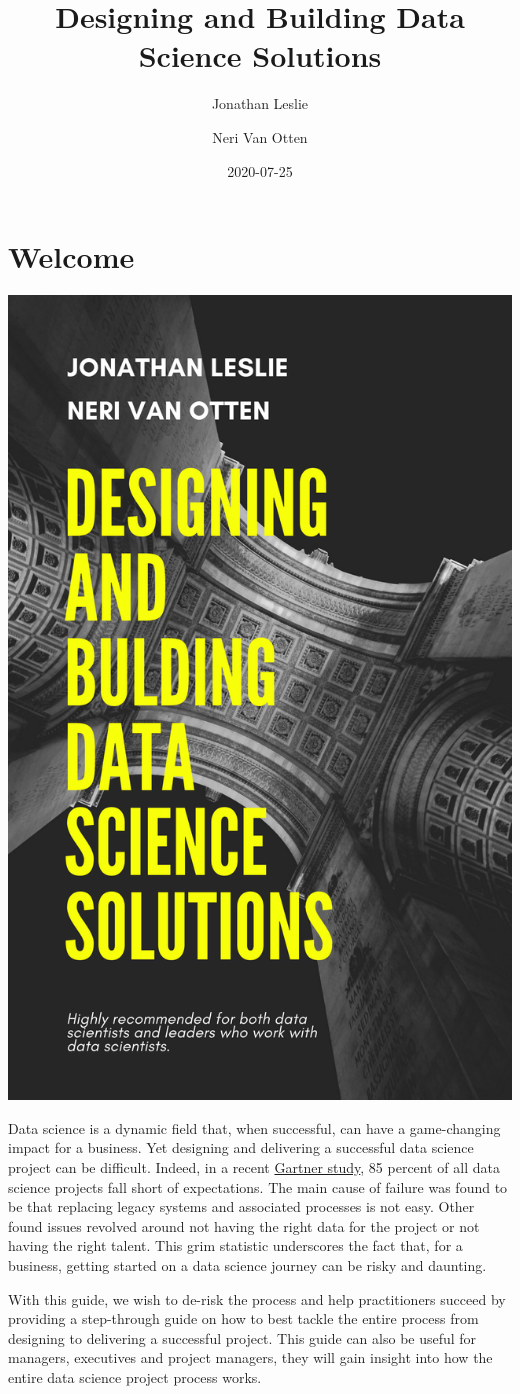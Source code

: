 \documentclass[
]{book}
\title{Designing and Building Data Science Solutions}
\author{Jonathan Leslie \and Neri Van Otten}
\date{2020-07-25}
\begin{document}
\maketitle

{
\setcounter{tocdepth}{1}
\tableofcontents
}
\hypertarget{welcome}{%
\chapter*{Welcome}\label{welcome}}

\includegraphics[width=0.5\linewidth,style="float:right; padding:10px"]{figures/Designing and bulding data science solutions}

Data science is a dynamic field that, when successful, can have a game-changing impact for a business. Yet designing and delivering a successful data science project can be difficult. Indeed, in a recent \href{https://www.gartner.com/en/newsroom/press-releases/2018-02-13-gartner-says-nearly-half-of-cios-are-planning-to-deploy-artificial-intelligence}{Gartner study}, 85 percent of all data science projects fall short of expectations. The main cause of failure was found to be that replacing legacy systems and associated processes is not easy. Other found issues revolved around not having the right data for the project or not having the right talent. This grim statistic underscores the fact that, for a business, getting started on a data science journey can be risky and daunting.

With this guide, we wish to de-risk the process and help practitioners succeed by providing a step-through guide on how to best tackle the entire process from designing to delivering a successful project. This guide can also be useful for managers, executives and project managers, they will gain insight into how the entire data science project process works.
\end{document}

